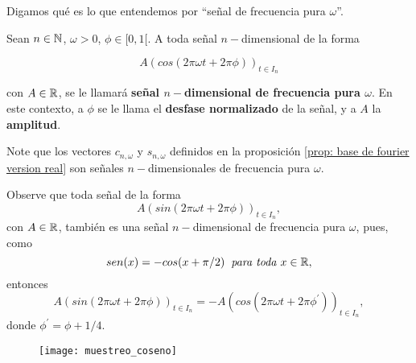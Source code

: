 Digamos qué es lo que 
entendemos por ``señal de frecuencia pura $\omega$''.

\begin{defi}
Sean $n \in \mathbb{N}$,  $\omega>0$, $\phi \in [0,1[$.  
A toda señal $n-$dimensional  
de la forma

\begin{equation}
A \left(
cos \left(  2 \pi \omega t + 2 \pi \phi
\right)
\right)_{t \in I_{n}}
\end{equation}

\noindent
con $A \in \mathbb{R}$, se le llamará
\textbf{señal $n-$dimensional de frecuencia
pura $\omega$}. En este contexto,
a $\phi$ se le llama el \textbf{desfase normalizado}
de la señal, y a $A$ la \textbf{amplitud}.
\end{defi}

Note que los vectores
$c_{n, \omega}$ y $s_{n, \omega}$
definidos en la proposición
\ref{prop: base de fourier version real} son
señales $n-$dimensionales de frecuencia pura $\omega$.

\begin{nota}
Observe que toda señal de la forma
\begin{equation*}
A \left(
sin \left(  2 \pi \omega t + 2 \pi \phi
\right)
\right)_{t \in I_{n}},
\end{equation*}
con $A \in \mathbb{R}$, también es una señal $n-$dimensional
de frecuencia pura $\omega$, pues, como 
\[
sen(x) = - cos (x+ \pi/2) \hspace{0.2cm}
\textit{para toda } x \in \mathbb{R},
\]
entonces
\begin{equation*}
A \left(
sin \left(  2 \pi \omega t + 2 \pi \phi
\right)
\right)_{t \in I_{n}} =
-A \left(
cos \left(  2 \pi \omega t + 2 \pi \phi^{'}
\right)
\right)_{t \in I_{n}},
\end{equation*}
donde $\phi^{'}= \phi + 1/4$.
\end{nota}


\begin{figure}[H]
	\centering
	\texttt{[image: muestreo\_coseno]} 
\end{figure}	


